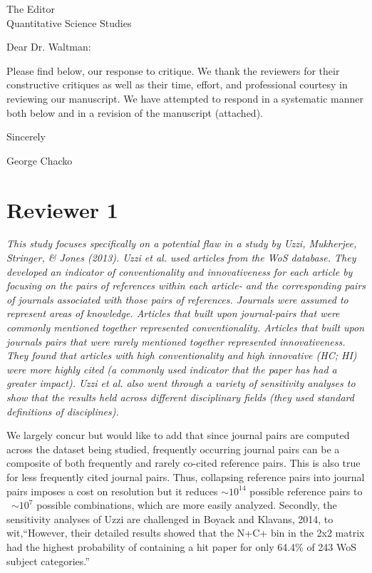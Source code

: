 \documentclass[11pt, oneside]{article}   	%
\begin{document}

The Editor\\
Quantitative Science Studies

Dear Dr. Waltman:

Please find below, our response to critique. We thank the reviewers for their constructive critiques as well as their time, effort, and professional courtesy in reviewing our manuscript. We have attempted to respond  in a systematic manner both below and in a revision of the manuscript (attached).

Sincerely

George Chacko

\section{Reviewer 1}

\emph{This study focuses specifically on a potential flaw in a study by Uzzi, Mukherjee, Stringer, \& Jones  (2013).  Uzzi et al. used articles from the WoS database. They developed an indicator of conventionality and innovativeness for each article by focusing on the pairs of references within each article- and the corresponding pairs of journals associated with those pairs of references. Journals were assumed to represent areas of knowledge. Articles that built upon journal-pairs that were commonly mentioned together represented conventionality.  Articles that built upon journals pairs that were rarely mentioned together represented innovativeness. They found that articles with high conventionality and high innovative (HC; HI) were more highly cited (a commonly used indicator that the paper has had a greater impact). Uzzi et al. also went through a variety of sensitivity analyses to show that the results held across different disciplinary fields (they used standard definitions of disciplines).}   

We largely concur but would like to add that since journal pairs are computed across the dataset being studied, frequently occurring journal pairs can be a composite of both frequently and rarely co-cited reference pairs. This is also true for less frequently cited journal pairs. Thus, collapsing reference pairs into journal pairs imposes a cost on resolution but it reduces $\sim10^{14}$ possible reference pairs to ~$\sim10^7$ possible combinations, which are more easily analyzed. Secondly, the sensitivity analyses of Uzzi are challenged in Boyack and Klavans, 2014, to wit,``However, their detailed results showed that the N+C+ bin in the 2x2 matrix had the highest probability of containing a hit paper for only 64.4\% of 243 WoS subject categories.'' 
\end{document}
